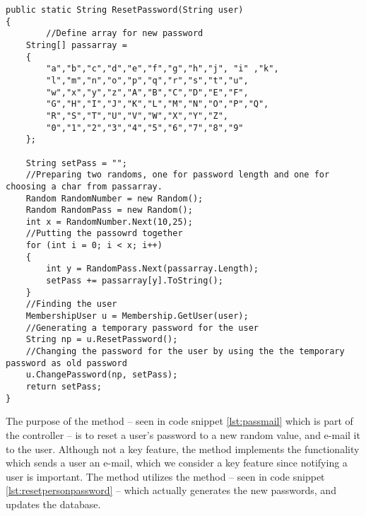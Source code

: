 \begin{lstlisting}[style=sourceCode, caption=\myCaption{The ResetPassword(String user) method}, label=lst:resetpersonpassword,float=hp]
public static String ResetPassword(String user)
{   
		//Define array for new password
    String[] passarray =
    {
        "a","b","c","d","e","f","g","h","j", "i" ,"k",
        "l","m","n","o","p","q","r","s","t","u",
        "w","x","y","z","A","B","C","D","E","F",
        "G","H","I","J","K","L","M","N","O","P","Q",
        "R","S","T","U","V","W","X","Y","Z",
        "0","1","2","3","4","5","6","7","8","9"
    };

    String setPass = "";
    //Preparing two randoms, one for password length and one for choosing a char from passarray.
    Random RandomNumber = new Random();
    Random RandomPass = new Random();
    int x = RandomNumber.Next(10,25);
    //Putting the passowrd together
    for (int i = 0; i < x; i++)
    {
        int y = RandomPass.Next(passarray.Length);
        setPass += passarray[y].ToString();
    }
    //Finding the user
    MembershipUser u = Membership.GetUser(user);
    //Generating a temporary password for the user
    String np = u.ResetPassword();
    //Changing the password for the user by using the the temporary password as old password
    u.ChangePassword(np, setPass);
    return setPass;
}
\end{lstlisting}

The purpose of the  method -- seen in code snippet \ref{lst:passmail} which is part of the  controller -- is to reset a user's password to a new random value, and e-mail it to the user.
Although not a key feature, the  method implements the functionality which sends a user an e-mail, which we consider a key feature since notifying a user is important.
The  method utilizes the  method -- seen in code snippet \ref{lst:resetpersonpassword} -- which actually generates the new passwords, and updates the database.

\newpage
